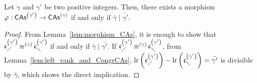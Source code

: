 \begin{Proposition} \label{prop:division_CAs}
    Let $\gamma$ and $\gamma'$ be two positive integers. Then, there
    exists a morphism $\varphi:\mathsf{CAs}^{\left(\gamma'\right)} \to \mathsf{CAs}^{\left(\gamma\right)}$ if and
    only if $\bar{\gamma} \mid \bar{\gamma'}$.
\end{Proposition}
\begin{proof}
    From Lemma~\ref{lem:morphism_CAs}, it is enough to show that
    $\mathfrak{c}^{\left(\gamma'\right)}_{\diagup} \operatorname{\equiv}^{(\gamma)} \mathfrak{c}^{\left(\gamma'\right)}_{\diagdown}$ if and only if
    $\bar{\gamma} \mid \bar{\gamma'}$. If
    $\mathfrak{c}^{\left(\gamma'\right)}_{\diagup}\operatorname{\equiv}^{(\gamma)}\mathfrak{c}^{\left(\gamma'\right)}_{\diagdown}$, from
    Lemma~\ref{lem:left_rank_and_CongrCAs},
    \begin{math}
        \mathrm{lr}\left(\mathfrak{c}^{\left(\gamma'\right)}_{\diagup}\right)
        - \mathrm{lr}\left(\mathfrak{c}^{\left(\gamma'\right)}_{\diagdown}\right)
        = \bar{\gamma'}
    \end{math}
    is divisible by $\bar{\gamma}$, which shows the direct implication.
    \smallbreak


\end{proof}
